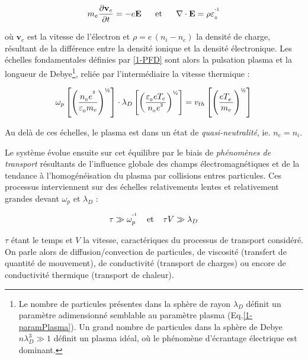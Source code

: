 \begin{align}
\label{1-PFD}
m_e\frac{\partial \mathbf{v}_e}{\partial t}=-e\mathbf E
\;\;\;\;\;\;\text{et}\;\;\;\;\;\;
\nabla\cdot\mathbf{E}=\rho\varepsilon_{_0}^{\operatorname{^{-1}}}
\end{align}

où $\mathbf{v}_e$ est la vitesse de l'électron et $\rho=e\,(n_i-n_e)$ la densité de charge,
résultant de la différence entre la densité ionique et la densité
électronique.
Les échelles fondamentales définies par \ref{1-PFD} sont alors la pulsation
plasma et la longueur de Debye\footnote{Le nombre de particules présentes
dans la sphère de rayon $\lambda_D$ définit un paramètre adimensionné
semblable au paramètre plasma (Eq.\ref{1-paramPlasma}). Un
grand nombre de particules dans la sphère de Debye $n\lambda_D^3\gg1$
définit un plasma idéal, où le phénomène d'écrantage électrique est
dominant.}, reliée par l'intermédiaire la vitesse thermique :

\begin{equation}
\omega_p\left[\left(\frac{n_{_0}e^{^2}}{\varepsilon_{_0}
m_e}\right)^\text{\textonehalf}
\right]\cdot\lambda_D\left[\left(\frac{\varepsilon_{_0}
eT_e}{n_{_0}e^{^2}}\right)^\text{\textonehalf}\right]
=v_{th}\left[\left(\frac{eT_e^{^{\phantom{1}}}}{m_e}\right)^\text{\textonehalf}\right]
\end{equation}

Au delà de ces échelles, le plasma est dans un état de \emph{quasi-neutralité}, ie. $n_e=n_i$.

Le système évolue ensuite sur cet équilibre par le biais de
\emph{phénomènes de transport} résultants de l'influence
globale des champs électromagnétiques et de la tendance à
l'homogénéisation du plasma par collisions entres particules.
Ces processus interviennent sur des échelles relativements
lentes et relativement grandes devant $\omega_p$ et $\lambda_D$ :

\begin{equation}
\tau\gg \omega_p^{\operatorname{^{-1}}} \;\;\;\;\text{et}\;\;\;\;\tau V\gg\lambda_D
\end{equation}

$\tau$ étant le temps et $V$ la vitesse, caractériques du processus de transport
considéré.
On parle alors de diffusion/convection de particules, de viscosité (transfert de
quantité de mouvement), de conductivité (transport de charges) ou encore de
conductivité thermique (transport de chaleur).

